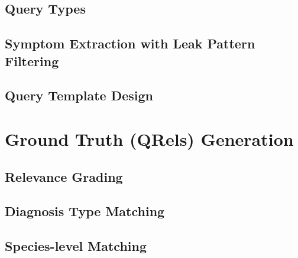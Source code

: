 \subsection{Query Types}
\label{subsec:dataset:queries:types}

\subsection{Symptom Extraction with Leak Pattern Filtering}
\label{subsec:dataset:queries:extraction}

\subsection{Query Template Design}
\label{subsec:dataset:queries:templates}

%
%
\section{Ground Truth (QRels) Generation}
\label{sec:dataset:qrels}

\subsection{Relevance Grading}
\label{subsec:dataset:qrels:grading}

\subsection{Diagnosis Type Matching}
\label{subsec:dataset:qrels:diagnosis}

\subsection{Species-level Matching}
\label{subsec:dataset:qrels:species}

